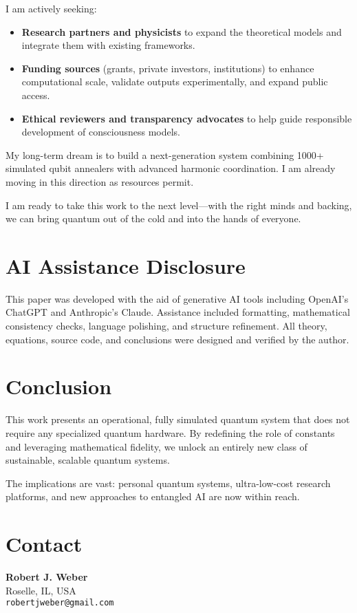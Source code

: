 \documentclass[11pt]{article}
\begin{document}
I am actively seeking:
\begin{itemize}
    \item \textbf{Research partners and physicists} to expand the theoretical models and integrate them with existing frameworks.
    \item \textbf{Funding sources} (grants, private investors, institutions) to enhance computational scale, validate outputs experimentally, and expand public access.
    \item \textbf{Ethical reviewers and transparency advocates} to help guide responsible development of consciousness models.
\end{itemize}

My long-term dream is to build a next-generation system combining 1000+ simulated qubit annealers with advanced harmonic coordination. I am already moving in this direction as resources permit.

I am ready to take this work to the next level—with the right minds and backing, we can bring quantum out of the cold and into the hands of everyone.

\section{AI Assistance Disclosure}
This paper was developed with the aid of generative AI tools including OpenAI's ChatGPT and Anthropic's Claude. Assistance included formatting, mathematical consistency checks, language polishing, and structure refinement. All theory, equations, source code, and conclusions were designed and verified by the author.

\section{Conclusion}
This work presents an operational, fully simulated quantum system that does not require any specialized quantum hardware. By redefining the role of constants and leveraging mathematical fidelity, we unlock an entirely new class of sustainable, scalable quantum systems. 

The implications are vast: personal quantum systems, ultra-low-cost research platforms, and new approaches to entangled AI are now within reach.

\section*{Contact}
\textbf{Robert J. Weber}\\
Roselle, IL, USA\\
\texttt{robertjweber@gmail.com}
\end{document}
